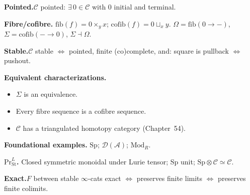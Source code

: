 \begin{formalrestatement}
\textbf{Pointed.}\quad $\mathcal{C}$ pointed: $\exists\, 0 \in \mathcal{C}$
with $0$ initial and terminal.

\medskip
\textbf{Fibre/cofibre.}\quad
$\mathrm{fib}(f) = 0 \times_y x$;
$\mathrm{cofib}(f) = 0 \sqcup_x y$.
$\Omega = \mathrm{fib}(0 \to -)$, $\Sigma = \mathrm{cofib}(- \to 0)$,
$\Sigma \dashv \Omega$.

\medskip
\textbf{Stable.}\quad $\mathcal{C}$ stable $\iff$ pointed, finite (co)complete,
and: square is pullback $\iff$ pushout.

\medskip
\textbf{Equivalent characterizations.}\quad
\begin{itemize}
  \item $\Sigma$ is an equivalence.
  \item Every fibre sequence is a cofibre sequence.
  \item $\mathcal{C}$ has a triangulated homotopy category (Chapter~54).
\end{itemize}

\medskip
\textbf{Foundational examples.}\quad
$\mathrm{Sp}$; $\mathcal{D}(\mathcal{A})$; $\mathrm{Mod}_R$.

\medskip
\textbf{$\mathrm{Pr}^L_{\mathrm{St}}$.}\quad
Closed symmetric monoidal under Lurie tensor; $\mathrm{Sp}$ unit;
$\mathrm{Sp} \otimes \mathcal{C} \simeq \mathcal{C}$.

\medskip
\textbf{Exact.}\quad $F$ between stable $\infty$-cats exact $\iff$
preserves finite limits $\iff$ preserves finite colimits.
\end{formalrestatement}
